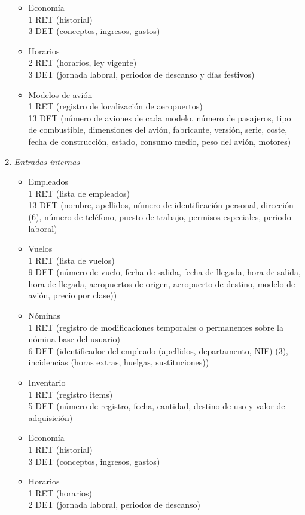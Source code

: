 \begin{enumerate}
\begin{itemize}
			\item Economía \\
			1 RET (historial)\\
			3 DET (conceptos, ingresos, gastos)\\
			\item Horarios \\
			2 RET (horarios, ley vigente)\\
			3 DET (jornada laboral, periodos de descanso y días festivos)\\
			\item Modelos de avión \\
			1 RET (registro de localización de aeropuertos)\\
			13 DET (número de aviones de cada modelo, número de pasajeros, tipo de combustible, dimensiones del avión, fabricante,
			versión, serie, coste, fecha de construcción, estado, consumo medio, peso del avión, motores)\\
		\end{itemize}

	\item \textit{Entradas internas}

		\begin{itemize}
			\item Empleados \\
			1 RET (lista de empleados)\\
			13 DET (nombre, apellidos, número de identificación personal, dirección (6), número de teléfono, puesto de trabajo,
			permisos especiales, periodo laboral)\\
			\item Vuelos \\
			1 RET (lista de vuelos)\\
			9 DET (número de vuelo, fecha de salida, fecha de llegada, hora de salida, hora de llegada, aeropuertos de origen,
			aeropuerto de destino, modelo de avión, precio por clase))\\
			\item Nóminas \\
			1 RET (registro de modificaciones temporales o permanentes sobre la nómina base del usuario)\\
			6 DET (identificador del empleado (apellidos, departamento, NIF) (3), incidencias (horas extras, huelgas, sustituciones))\\
			\item Inventario \\
			1 RET (registro items)\\
			5 DET (número de registro, fecha, cantidad, destino de uso y valor de adquisición)\\
			\item Economía \\
			1 RET (historial)\\
			3 DET (conceptos, ingresos, gastos)\\
			\item Horarios \\
			1 RET (horarios)\\
			2 DET (jornada laboral, periodos de descanso)\\
		\end{itemize}


\end{enumerate}
